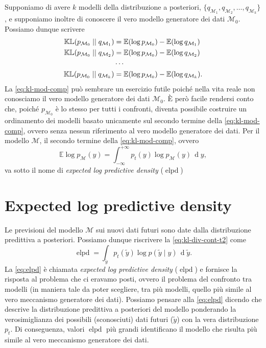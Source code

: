 \documentclass[
  10pt,
  italian,
  a4paper,
  extrafontsizes,onecolumn,openright
  ]{memoir}
\newcommand{\E}{\mathbb{E}} %
\DeclareMathOperator{\elpd}{elpd} %
\theoremstyle{definition}
\theoremstyle{definition}
\theoremstyle{definition}
\theoremstyle{definition}
\theoremstyle{remark}
\begin{document}
Supponiamo di avere \(k\) modelli della distribuzione a posteriori, \(\{q_{\mathcal{M}_1}, q_{\mathcal{M}_2}, \dots, q_{\mathcal{M}_k}\}\), e supponiamo inoltre di conoscere il vero modello generatore dei dati \(\mathcal{M}_0\). Possiamo dunque scrivere
\begin{align}
\mathbb{KL} (p_{\mathcal{M}_0} \mid\mid q_{\mathcal{M}_1}) &= \E (\log p_{\mathcal{M}_0}) - \E (\log q_{\mathcal{M}_1})\notag\\
\mathbb{KL} (p_{\mathcal{M}_0} \mid\mid q_{\mathcal{M}_2}) &= \E (\log p_{\mathcal{M}_0}) - \E (\log q_{\mathcal{M}_2})\notag\\
&\cdots\notag\\
\mathbb{KL} (p_{\mathcal{M}_0} \mid\mid q_{\mathcal{M}_k}) &= \E (\log p_{\mathcal{M}_0}) - \E (\log q_{\mathcal{M}_k}).
\label{eq:kl-mod-comp}
\end{align}
La \eqref{eq:kl-mod-comp} può sembrare un esercizio futile poiché nella vita reale non conosciamo il vero modello generatore dei dati \(\mathcal{M}_0\). È però facile rendersi conto che, poiché \(p_{\mathcal{M}_0}\) è lo stesso per tutti i confronti, diventa possibile costruire un ordinamento dei modelli basato unicamente sul secondo termine della \eqref{eq:kl-mod-comp}, ovvero senza nessun riferimento al vero modello generatore dei dati. Per il modello \(\mathcal{M}\), il secondo termine della \eqref{eq:kl-mod-comp}, ovvero
\begin{equation}
\E \log p_{\mathcal{M}}(y) = \int_{-\infty}^{+\infty}p_{t}(y)\log p_{\mathcal{M}}(y) \,\operatorname {d}\!y,
\label{eq:kl-div-cont-t2}
\end{equation}
va sotto il nome di \emph{expected log predictive density} (\(\elpd\))

\hypertarget{expected-log-predictive-density}{%
\section{Expected log predictive density}\label{expected-log-predictive-density}}

Le previsioni del modello \(\mathcal{M}\) sui nuovi dati futuri sono date dalla distribuzione predittiva a posteriori. Possiamo dunque riscrivere la \eqref{eq:kl-div-cont-t2} come
\begin{equation}
\elpd = \int_{\tilde{y}} p_{t}(\tilde{y}) \log p(\tilde{y} \mid y) \,\operatorname {d}\!\tilde{y}.
\label{eq:elpd}
\end{equation}
La \eqref{eq:elpd} è chiamata \emph{expected log predictive density} (\(\elpd\)) e fornisce la risposta al problema che ci eravamo posti, ovvero il problema del confronto tra modelli (in maniera tale da poter scegliere, tra più modelli, quello più simile al vero meccanismo generatore dei dati). Possiamo pensare alla \eqref{eq:elpd} dicendo che descrive la distribuzione predittiva a posteriori del modello ponderando la verosimiglianza dei possibili (sconosciuti) dati futuri (\(\tilde{y}\)) con la vera distribuzione \(p_t\). Di conseguenza, valori \(\elpd\) più grandi identificano il modello che risulta più simile al vero meccanismo generatore dei dati.
\end{document}
